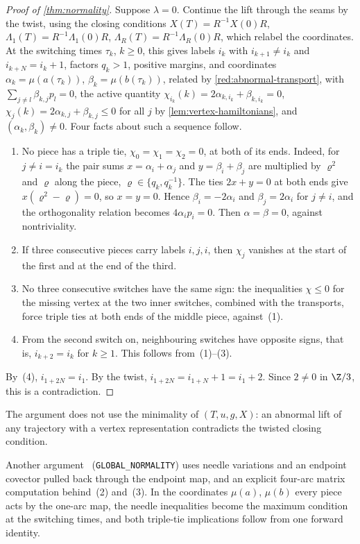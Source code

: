 \begin{proof}[Proof of \cref{thm:normality}]
Suppose $\lambda=0$. Continue the lift through the seams by the twist, using the closing conditions
$X(T)=R^{-1}X(0)R$, $\Lambda_1(T)=R^{-1}\Lambda_1(0)R$, $\Lambda_R(T)=R^{-1}\Lambda_R(0)R$, which
relabel the coordinates. At the switching times $\tau_k$, $k\ge0$, this gives labels $i_k$ with
$i_{k+1}\ne i_k$ and $i_{k+N}=i_k+1$, factors $q_k>1$, positive margins, and coordinates
$\alpha_k=\mu(a(\tau_k))$, $\beta_k=\mu(b(\tau_k))$, related by \cref{red:abnormal-transport}, with
$\sum_{j\ne l}\beta_{k,j}p_l=0$, the active quantity
$\chi_{i_k}(k)=2\alpha_{k,i_k}+\beta_{k,i_k}=0$, $\chi_j(k)=2\alpha_{k,j}+\beta_{k,j}\le0$ for all
$j$ by \cref{lem:vertex-hamiltonians}, and $(\alpha_k,\beta_k)\ne0$. Four facts about such a sequence follow.
\begin{enumerate}
\item No piece has a triple tie, $\chi_0=\chi_1=\chi_2=0$, at both of its ends. Indeed, for $j\ne i=i_k$ the pair sums
  $x=\alpha_i+\alpha_j$ and $y=\beta_i+\beta_j$ are multiplied by $\varrho^2$ and $\varrho$ along the
  piece, $\varrho\in\{q_k,q_k^{-1}\}$. The ties $2x+y=0$ at both ends give $x(\varrho^2-\varrho)=0$,
  so $x=y=0$. Hence $\beta_i=-2\alpha_i$ and $\beta_j=2\alpha_i$ for $j\ne i$, and the orthogonality
  relation becomes $4\alpha_ip_i=0$. Then $\alpha=\beta=0$, against nontriviality.
\item If three consecutive pieces carry labels $i,j,i$, then $\chi_j$ vanishes at the start of the
  first and at the end of the third.
\item No three consecutive switches have the same sign: the
  inequalities $\chi\le0$ for the missing vertex at the two inner switches, combined with the
  transports, force triple ties at both ends of the middle piece, against~(1).
\item From the second switch on, neighbouring switches have opposite signs, that is,
  $i_{k+2}=i_k$ for $k\ge1$. This follows from~(1)--(3).
\end{enumerate}
By~(4), $i_{1+2N}=i_1$. By the twist, $i_{1+2N}=i_{1+N}+1=i_1+2$. Since $2\ne0$ in $\Z/3$, this is
a contradiction.
\end{proof}

The argument does not use the minimality of $(T,u,g,X)$: an abnormal lift of any trajectory with a
vertex representation contradicts the twisted closing condition.

Another argument~\cite{Notes} (\texttt{GLOBAL\_NORMALITY}) uses needle variations and an endpoint
covector pulled back through the endpoint map, and an explicit four-arc matrix computation
behind~(2) and~(3). In the coordinates $\mu(a)$, $\mu(b)$ every piece acts by the one-arc map, the
needle inequalities become the maximum condition at the switching times, and both triple-tie
implications follow from one forward identity.

